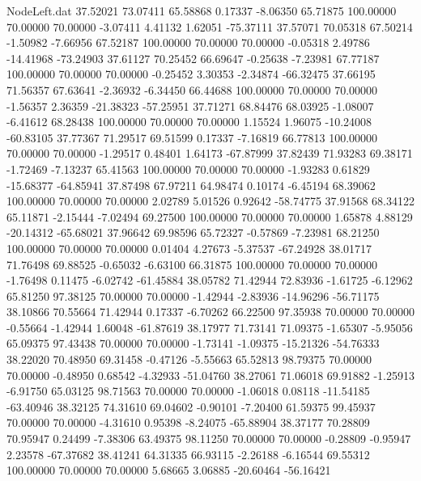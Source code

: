 \begin{filecontents}{NodeLeft.dat}
  37.52021   73.07411   65.58868     0.17337   -8.06350   65.71875  100.00000   70.00000   70.00000   -3.07411    4.41132    1.62051  -75.37111
  37.57071   70.05318   67.50214    -1.50982   -7.66956   67.52187  100.00000   70.00000   70.00000   -0.05318    2.49786  -14.41968  -73.24903
  37.61127   70.25452   66.69647    -0.25638   -7.23981   67.77187  100.00000   70.00000   70.00000   -0.25452    3.30353   -2.34874  -66.32475
  37.66195   71.56357   67.63641    -2.36932   -6.34450   66.44688  100.00000   70.00000   70.00000   -1.56357    2.36359  -21.38323  -57.25951
  37.71271   68.84476   68.03925    -1.08007   -6.41612   68.28438  100.00000   70.00000   70.00000    1.15524    1.96075  -10.24008  -60.83105
  37.77367   71.29517   69.51599     0.17337   -7.16819   66.77813  100.00000   70.00000   70.00000   -1.29517    0.48401    1.64173  -67.87999
  37.82439   71.93283   69.38171    -1.72469   -7.13237   65.41563  100.00000   70.00000   70.00000   -1.93283    0.61829  -15.68377  -64.85941
  37.87498   67.97211   64.98474     0.10174   -6.45194   68.39062  100.00000   70.00000   70.00000    2.02789    5.01526    0.92642  -58.74775
  37.91568   68.34122   65.11871    -2.15444   -7.02494   69.27500  100.00000   70.00000   70.00000    1.65878    4.88129  -20.14312  -65.68021
  37.96642   69.98596   65.72327    -0.57869   -7.23981   68.21250  100.00000   70.00000   70.00000    0.01404    4.27673   -5.37537  -67.24928
  38.01717   71.76498   69.88525    -0.65032   -6.63100   66.31875  100.00000   70.00000   70.00000   -1.76498    0.11475   -6.02742  -61.45884
  38.05782   71.42944   72.83936    -1.61725   -6.12962   65.81250   97.38125   70.00000   70.00000   -1.42944   -2.83936  -14.96296  -56.71175
  38.10866   70.55664   71.42944     0.17337   -6.70262   66.22500   97.35938   70.00000   70.00000   -0.55664   -1.42944    1.60048  -61.87619
  38.17977   71.73141   71.09375    -1.65307   -5.95056   65.09375   97.43438   70.00000   70.00000   -1.73141   -1.09375  -15.21326  -54.76333
  38.22020   70.48950   69.31458    -0.47126   -5.55663   65.52813   98.79375   70.00000   70.00000   -0.48950    0.68542   -4.32933  -51.04760
  38.27061   71.06018   69.91882    -1.25913   -6.91750   65.03125   98.71563   70.00000   70.00000   -1.06018    0.08118  -11.54185  -63.40946
  38.32125   74.31610   69.04602    -0.90101   -7.20400   61.59375   99.45937   70.00000   70.00000   -4.31610    0.95398   -8.24075  -65.88904
  38.37177   70.28809   70.95947     0.24499   -7.38306   63.49375   98.11250   70.00000   70.00000   -0.28809   -0.95947    2.23578  -67.37682
  38.41241   64.31335   66.93115    -2.26188   -6.16544   69.55312  100.00000   70.00000   70.00000    5.68665    3.06885  -20.60464  -56.16421

\end{filecontents}
